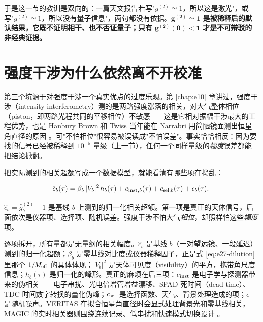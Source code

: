 于是这一节的教训是双向的：一篇天文报告若写"\(g^{(2)}\simeq1\)，所以这是激光"，或写"\(g^{(2)}\simeq1\)，所以没有量子信息"，两句都没有依据。\(\mathbf{g^{(2)}\simeq1}\) \textbf{是被稀释后的默认结果，它既不证明相干、也不否证量子；只有 }\(\mathbf{g^{(2)}(0)<1}\)\textbf{ 才是不可辩驳的非经典证据。}


\section{强度干涉为什么依然离不开校准}
\label{sec:e27-calibration}

第三个坑源于对强度干涉一个真实优点的过度乐观。第 \ref{chap:e10} 章讲过，强度干涉（intensity interferometry）测的是两路强度涨落的相关，对大气整体相位（piston，即两路光程共同的平移相位）不敏感——这是它相对振幅干涉最大的工程优势，也是 Hanbury Brown 和 Twiss 当年能在 Narrabri 用简陋镜面测出恒星角直径的原因 \citep{1956Natur.178.1046H,1957RSPSA.242..300B,1974iiia.book.....H}。可"不怕相位"很容易被误读成"不怕误差"。事实恰恰相反：因为要找的信号已经被稀释到 \(10^{-5}\) 量级（上一节），任何一个同样量级的\emph{幅度}误差都能把结论掀翻。

把实际测到的相关超额写成一个数据模型，就能看清有哪些项在捣乱：

\begin{equation}
  \hat c_b(\tau)=
  \beta_b\,|V_b|^2\,h_b(\tau)
  +c_{{\rm inst},b}(\tau)
  +c_{{\rm sel},b}(\tau)
  +\epsilon_b(\tau).
  \label{eq:e27-calibration-model}
\end{equation}
\begin{formulaexplain}
\(\hat c_b=\hat g_b^{(2)}-1\) 是基线 \(b\) 上测到的归一化相关超额。第一项是真正的天体信号，后面依次是仪器项、选择项、随机误差。强度干涉不怕大气\emph{相位}，却照样怕这些\emph{幅度}项。
\end{formulaexplain}

逐项拆开，所有量都是无量纲的相关幅度。\(\hat c_b\) 是基线 \(b\)（一对望远镜、一段延迟）测到的归一化超额；\(\beta_b\) 是零基线对比度或仪器稀释因子，正是式 \eqref{eq:e27-dilution} 里那个 \(1/M_{\rm eff}\) 的具体体现；\(|V_b|^2\) 是天体可见度（visibility）的平方，携带角尺度信息；\(h_b(\tau)\) 是归一化的峰形。真正的麻烦在后三项：\(c_{\rm inst}\) 是电子学与探测器带来的伪相关——电子串扰、光电倍增管增益漂移、SPAD 死时间（dead time）、TDC 时间数字转换的量化伪峰；\(c_{\rm sel}\) 是选择函数、天气、背景处理造成的项；\(\epsilon\) 是随机噪声。VERITAS 在拟合恒星角直径时会显式处理背景光和零基线相关，MAGIC 的实时相关器则围绕连续记录、低串扰和快速模式切换设计 \citep{2020NatAs...4.1164A,2024MNRAS.529.4387A,2024ApJ...966...28A}。

